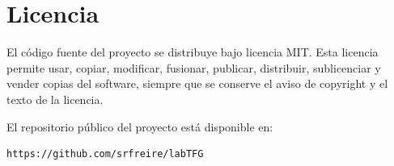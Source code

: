 \chapter{Licencia}

El código fuente del proyecto se distribuye bajo licencia MIT. Esta licencia
permite usar, copiar, modificar, fusionar, publicar, distribuir, sublicenciar y
vender copias del software, siempre que se conserve el aviso de copyright y el
texto de la licencia.

El repositorio público del proyecto está disponible en:

\begin{verbatim}
https://github.com/srfreire/labTFG
\end{verbatim}
